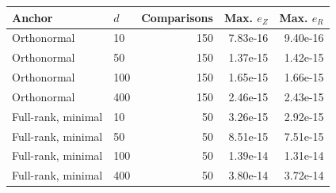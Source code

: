 \begin{tabular}{llrrr}
\hline
Anchor & $d$ & Comparisons & Max. $e_Z$ & Max. $e_R$ \\
\hline
Orthonormal & 10 & 150 & 7.83e-16 & 9.40e-16 \\
Orthonormal & 50 & 150 & 1.37e-15 & 1.42e-15 \\
Orthonormal & 100 & 150 & 1.65e-15 & 1.66e-15 \\
Orthonormal & 400 & 150 & 2.46e-15 & 2.43e-15 \\
Full-rank, minimal & 10 & 50 & 3.26e-15 & 2.92e-15 \\
Full-rank, minimal & 50 & 50 & 8.51e-15 & 7.51e-15 \\
Full-rank, minimal & 100 & 50 & 1.39e-14 & 1.31e-14 \\
Full-rank, minimal & 400 & 50 & 3.80e-14 & 3.72e-14 \\
\hline
\end{tabular}
